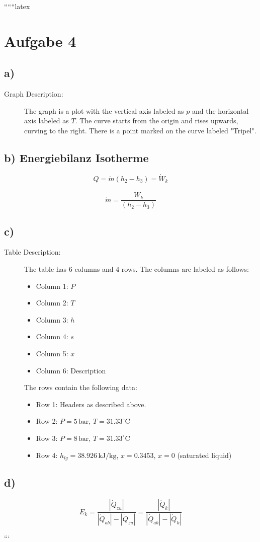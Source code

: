 
``````latex


\section*{Aufgabe 4}

\subsection*{a)}

\begin{description}
    \item[Graph Description:] The graph is a plot with the vertical axis labeled as \( p \) and the horizontal axis labeled as \( T \). The curve starts from the origin and rises upwards, curving to the right. There is a point marked on the curve labeled "Tripel".
\end{description}

\subsection*{b) Energiebilanz Isotherme}

\[
Q = \dot{m} (h_2 - h_3) = \dot{W}_k
\]

\[
\dot{m} = \frac{\dot{W}_k}{(h_2 - h_3)}
\]

\subsection*{c)}

\begin{description}
    \item[Table Description:] The table has 6 columns and 4 rows. The columns are labeled as follows: 
    \begin{itemize}
        \item Column 1: \( P \)
        \item Column 2: \( T \)
        \item Column 3: \( h \)
        \item Column 4: \( s \)
        \item Column 5: \( x \)
        \item Column 6: Description
    \end{itemize}
    The rows contain the following data:
    \begin{itemize}
        \item Row 1: Headers as described above.
        \item Row 2: \( P = 5 \, \text{bar} \), \( T = 31.33^\circ \text{C} \)
        \item Row 3: \( P = 8 \, \text{bar} \), \( T = 31.33^\circ \text{C} \)
        \item Row 4: \( h_{lg} = 38.926 \, \text{kJ/kg} \), \( x = 0.3453 \), \( x = 0 \) (saturated liquid)
    \end{itemize}
\end{description}

\subsection*{d)}

\[
E_k = \frac{|\dot{Q}_{zu}|}{|\dot{Q}_{ab}| - |\dot{Q}_{zu}|} = \frac{|\dot{Q}_k|}{|\dot{Q}_{ab}| - |\dot{Q}_k|}
\]

```